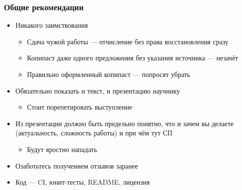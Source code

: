 \documentclass[xetex,mathserif,serif]{beamer}
\begin{document}
    \begin{frame}
        \frametitle{Общие рекомендации}
        \begin{itemize}
            \item Никакого заимствования 
            \begin{itemize}
                \item Сдача чужой работы --- отчисление без права восстановления сразу
                \item Копипаст даже одного предложения без указания источника --- незачёт
                \item Правильно оформленный копипаст --- попросят убрать
            \end{itemize}
            \item Обязательно показать и текст, и презентацию научнику
            \begin{itemize}
                \item Стоит порепетировать выступление
            \end{itemize}
            \item Из презентации должно быть предельно понятно, что и зачем вы делаете (актуальность, сложность работы) и при чём тут СП
            \begin{itemize}
                \item Будут яростно нападать
            \end{itemize}
            \item Озаботьтесь получением отзывов заранее
            \item Код --- CI, юнит-тесты, README, лицензия
        \end{itemize}
    \end{frame}
\end{document}
